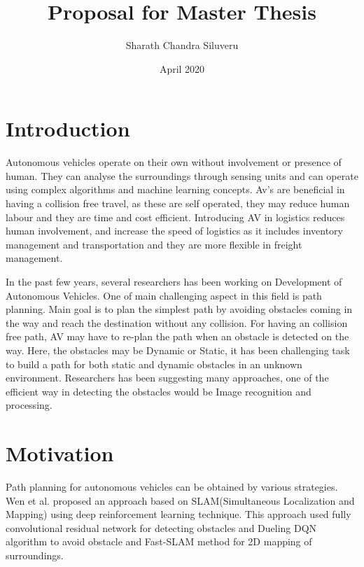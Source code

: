 \documentclass[a4paper]{article}
\title{ Proposal for Master Thesis }
\author{Sharath Chandra Siluveru}
\date{April 2020}
\begin{document}

\maketitle

\section{Introduction}
Autonomous vehicles operate on their own without involvement or presence of human. They can analyse the surroundings through sensing units and can operate using complex algorithms and machine learning concepts.  Av's are beneficial in having a collision free travel,  as these are self operated, they may reduce human labour and they are time and cost efficient. Introducing AV in logistics reduces human involvement, and increase the speed of logistics as it includes inventory management and transportation and they are more flexible in freight management.


In the past few years, several researchers has been working on Development of Autonomous Vehicles. One of main challenging aspect in this field is path planning. Main goal is to plan the simplest path by avoiding obstacles coming in the way and reach the destination without any collision. For having an collision free path, AV may have to re-plan the path when an obstacle is detected on the way. Here, the obstacles may be Dynamic or Static, it has been challenging task to build a path for both static and dynamic obstacles in an unknown environment. Researchers has been suggesting many approaches, one of the efficient way in detecting the obstacles would be Image recognition and processing. 

\section{Motivation}

Path planning for autonomous vehicles can be obtained by various strategies. Wen et al. proposed an approach based on SLAM(Simultaneous Localization and Mapping) using deep reinforcement learning technique. This approach used fully convolutional residual network for detecting obstacles and Dueling DQN algorithm to avoid obstacle and Fast-SLAM method for 2D mapping of surroundings.\cite{Wen2020PathEnvironments}
\end{document}
